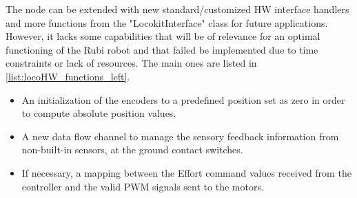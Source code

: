 The node can be extended with new standard/customized HW interface handlers and more functions from the "LocokitInterface" class for future applications.
However, it lacks some capabilities that will be of relevance for an optimal functioning of the Rubi robot and that failed be implemented due to time constraints or lack of resources. 
The main ones are listed in \ref{list:locoHW_functions_left}.

\begin{itemize}
\label{list:locoHW_functions_left}
	\item An initialization of the encoders to a predefined position set as zero in order to compute absolute position values.
	\item A new data flow channel to manage the sensory feedback information from non-built-in sensors, at the ground contact switches.
	\item If necessary, a mapping between the Effort command values received from the controller and the valid PWM signals sent to the motors.  
\end{itemize}

